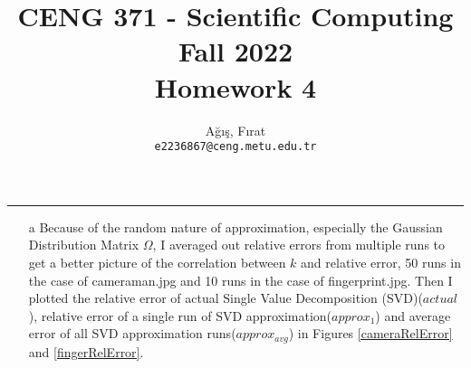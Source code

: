 \documentclass[10pt,a4paper, margin=1in]{article}
\author{
  Ağış, Fırat\\
  \texttt{e2236867@ceng.metu.edu.tr}
}
\title{CENG 371 - Scientific Computing \\
Fall 2022 \\
Homework 4}
\begin{document}
\maketitle

\noindent\rule{19cm}{1.2pt}

\begin{enumerate}
    \item[a]
    	Because of the random nature of approximation, especially the Gaussian Distribution Matrix $\Omega$, I averaged out relative errors from multiple runs to get a better picture of the correlation between $k$ and relative error, 50 runs in the case of cameraman.jpg and 10 runs in the case of fingerprint.jpg. Then I plotted the relative error of actual Single Value Decomposition (SVD)($actual$), relative error of a single run of SVD approximation($approx_1$) and average error of all SVD approximation runs($approx_{avg}$) in Figures \ref{cameraRelError} and \ref{fingerRelError}.
    	

\end{enumerate}
\end{document}
